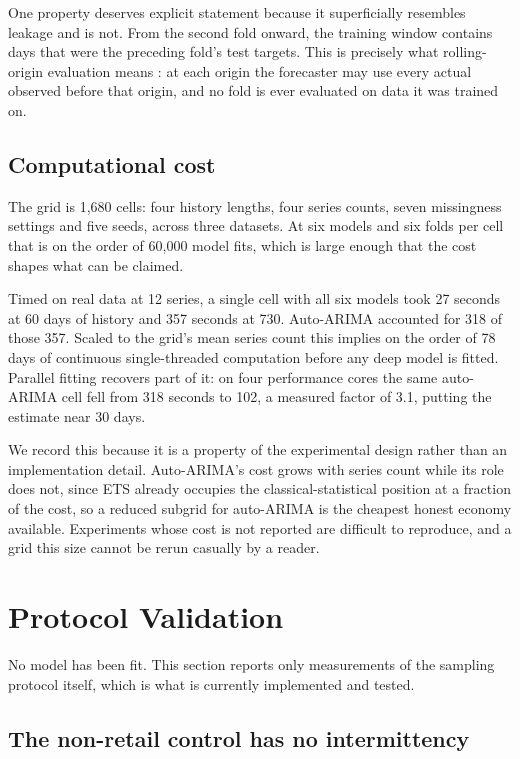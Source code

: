 \documentclass[11pt]{article}
\begin{document}
One property deserves explicit statement because it superficially resembles
leakage and is not. From the second fold onward, the training window contains
days that were the preceding fold's test targets. This is precisely what
rolling-origin evaluation means \citep{tashman2000}: at each origin the
forecaster may use every actual observed before that origin, and no fold is ever
evaluated on data it was trained on.

\subsection{Computational cost}
\label{sec:cost}

The grid is 1{,}680 cells: four history lengths, four series counts, seven
missingness settings and five seeds, across three datasets. At six models and six
folds per cell that is on the order of 60{,}000 model fits, which is large enough
that the cost shapes what can be claimed.

Timed on real data at 12 series, a single cell with all six models took 27
seconds at 60 days of history and 357 seconds at 730. Auto-ARIMA accounted for
318 of those 357. Scaled to the grid's mean series count this implies on the
order of 78 days of continuous single-threaded computation before any deep model
is fitted. Parallel fitting recovers part of it: on four performance cores the
same auto-ARIMA cell fell from 318 seconds to 102, a measured factor of 3.1,
putting the estimate near 30 days.

We record this because it is a property of the experimental design rather than an
implementation detail. Auto-ARIMA's cost grows with series count while its role
does not, since ETS already occupies the classical-statistical position at a
fraction of the cost, so a reduced subgrid for auto-ARIMA is the cheapest honest
economy available. Experiments whose cost is not reported are difficult to
reproduce, and a grid this size cannot be rerun casually by a reader.

\section{Protocol Validation}
\label{sec:validation}

No model has been fit. This section reports only measurements of the sampling
protocol itself, which is what is currently implemented and tested.

\subsection{The non-retail control has no intermittency}
\end{document}
